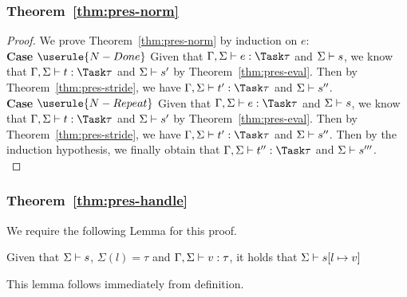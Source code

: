 \subsubsection{Theorem~\ref{thm:pres-norm}}

\begin{proof}
  We prove Theorem~\ref{thm:pres-norm} by induction on $e$:\\

  \noindent\textbf{Case} $\userule{N-Done}$ Given that
  $\Gamma,\Sigma\infers e:\Task\tau$ and $\Sigma\vdash s$, we know that
  $\Gamma,\Sigma\infers t:\Task\tau$ and $\Sigma\vdash s'$ by
  Theorem~\ref{thm:pres-eval}. Then by Theorem~\ref{thm:pres-stride}, we have
  $\Gamma,\Sigma\infers t':\Task\tau$ and $\Sigma\vdash s''$.\\

  \noindent\textbf{Case} $\userule{N-Repeat}$ Given that
  $\Gamma,\Sigma\infers e:\Task\tau$ and $\Sigma\vdash s$, we know that
  $\Gamma,\Sigma\infers t:\Task\tau$ and $\Sigma\vdash s'$ by
  Theorem~\ref{thm:pres-eval}. Then by Theorem~\ref{thm:pres-stride}, we have
  $\Gamma,\Sigma\infers t':\Task\tau$ and $\Sigma\vdash s''$. Then by the
  induction hypothesis, we finally obtain that
  $\Gamma,\Sigma\infers t'':\Task\tau$ and $\Sigma\vdash s'''$.\\

\end{proof}

\subsubsection{Theorem~\ref{thm:pres-handle}}

We require the following Lemma for this proof.

\begin{lemma}
  Given that $\Sigma\vdash s$, $\Sigma(l)=\tau$ and $\Gamma,\Sigma\vdash v:\tau$, it holds that $\Sigma\vdash s[l\mapsto v]$
  \label{lemmasigmaconsistent}
\end{lemma}
This lemma follows immediately from definition.

